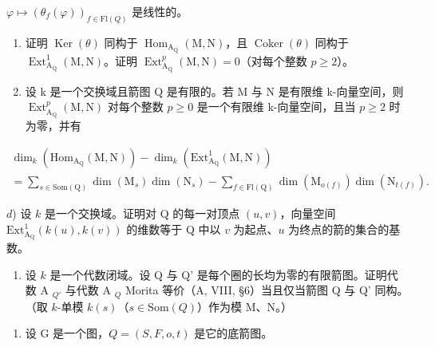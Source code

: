  \(\varphi\mapsto(\theta_{f}(\varphi))_{f\in\mathrm{Fl}(Q)}\) 是线性的。

\begin{enumerate}
\def\labelenumi{\alph{enumi})}
\setcounter{enumi}{1}
\item
  证明 \(\operatorname{Ker}(\theta)\) 同构于 \(\operatorname{Hom}_{\mathrm{A}_{\mathrm{Q}}}(\mathrm{M},\mathrm{N})\)，且 \(\operatorname{Coker}(\theta)\) 同构于 \(\operatorname{Ext}_{\mathrm{A}_{\mathrm{Q}}}^{1}(\mathrm{M},\mathrm{N})\)。证明 \(\operatorname{Ext}_{\mathrm{A}_{\mathrm{Q}}}^{p}(\mathrm{M},\mathrm{N}) = 0\)（对每个整数 \(p \geqslant 2\)）。
\item
  设 k 是一个交换域且箭图 Q 是有限的。若 M 与 N 是有限维 k-向量空间，则 \(\operatorname{Ext}_{\mathrm{A}_{\mathrm{Q}}}^{p}(\mathrm{M},\mathrm{N})\) 对每个整数 \(p \geqslant 0\) 是一个有限维 k-向量空间，且当 \(p \geqslant 2\) 时为零，并有
\end{enumerate}

\[
\begin{array}{l} \dim_ {k} (\mathrm{Hom} _ {\mathrm{A} _ {\mathrm{Q}}} (\mathrm{M}, \mathrm{N})) - \dim_ {k} (\mathrm{Ext} _ {\mathrm{A} _ {\mathrm{Q}}} ^ {1} (\mathrm{M}, \mathrm{N})) \\ = \sum_ {s \in \mathrm{Som} (\mathrm{Q})} \dim (\mathrm{M} _ {s}) \dim (\mathrm{N} _ {s}) - \sum_ {f \in \mathrm{Fl} (\mathrm{Q})} \dim (\mathrm{M} _ {o (f)}) \dim (\mathrm{N} _ {t (f)}). \end{array}
\]

\(d\)) 设 \(k\) 是一个交换域。证明对 Q 的每一对顶点 \((u,v)\)，向量空间 \(\mathrm{Ext}_{\mathrm{A_Q}}^1 (k(u),k(v))\) 的维数等于 Q 中以 \(v\) 为起点、\(u\) 为终点的箭的集合的基数。

\begin{enumerate}
\def\labelenumi{\arabic{enumi})}
\setcounter{enumi}{9}
\item
  设 \(k\) 是一个代数闭域。设 Q 与 Q' 是每个圈的长均为零的有限箭图。证明代数 A \(_{Q'}\) 与代数 A \(_{Q}\) Morita 等价（A, VIII, §6）当且仅当箭图 Q 与 Q' 同构。（取 \(k\)-单模 \(k(s)\)（\(s \in \text{Som}(Q)\)）作为模 M、N。）
\end{enumerate}

\exercisegroup

\begin{enumerate}
\def\labelenumi{\arabic{enumi})}
\item
  设 G 是一个图，\(Q = (S, F, o, t)\) 是它的底箭图。
\end{enumerate}

